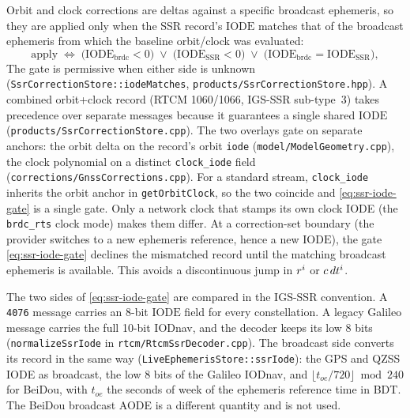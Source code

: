 \documentclass[main.tex]{subfiles}
\begin{document}
Orbit and clock corrections are deltas against a specific
broadcast ephemeris, so they are applied only when the SSR record's
$\mathrm{IODE}$ matches that of the broadcast ephemeris from which the
baseline orbit/clock was evaluated:
\begin{equation}
\text{apply}
\;\Longleftrightarrow\;
\big(\mathrm{IODE}_{\mathrm{brdc}} < 0\big)
\;\vee\;
\big(\mathrm{IODE}_{\mathrm{SSR}} < 0\big)
\;\vee\;
\big(\mathrm{IODE}_{\mathrm{brdc}} = \mathrm{IODE}_{\mathrm{SSR}}\big),
\label{eq:ssr-iode-gate}
\end{equation}
The gate is permissive when either side is unknown
(\texttt{SsrCorrectionStore::iodeMatches},
\texttt{products/SsrCorrectionStore.hpp}). A combined orbit+clock
record (RTCM 1060/1066, IGS-SSR sub-type~3) takes precedence over separate
messages because it guarantees a single shared $\mathrm{IODE}$
(\texttt{products/SsrCorrectionStore.cpp}). The two overlays gate on
separate anchors: the orbit delta on the record's orbit
\texttt{iode} (\texttt{model/ModelGeometry.cpp}), the clock polynomial on
a distinct \texttt{clock\_iode} field
(\texttt{corrections/GnssCorrections.cpp}). For a standard stream,
\texttt{clock\_iode} inherits the orbit anchor in \texttt{getOrbitClock},
so the two coincide and \eqref{eq:ssr-iode-gate} is a single gate. Only a
network clock that stamps its own clock IODE (the \texttt{brdc\_rts} clock
mode) makes them differ. At a correction-set boundary (the provider switches to a new
ephemeris reference, hence a new $\mathrm{IODE}$), the gate
\eqref{eq:ssr-iode-gate} declines the mismatched record until the matching
broadcast ephemeris is available. This avoids a discontinuous jump in
$r^{i}$ or $c\,dt^i$.

The two sides of \eqref{eq:ssr-iode-gate} are compared in the IGS-SSR
convention. A \texttt{4076} message carries an 8-bit $\mathrm{IODE}$ field
for every constellation. A legacy Galileo message carries the full 10-bit
IODnav, and the decoder keeps its low 8 bits
(\texttt{normalizeSsrIode} in \texttt{rtcm/RtcmSsrDecoder.cpp}). The
broadcast side converts its record in the same way
(\texttt{LiveEphemerisStore::ssrIode}): the GPS and QZSS IODE as broadcast,
the low 8 bits of the Galileo IODnav, and
$\lfloor t_{oe}/720\rfloor \bmod 240$ for BeiDou, with $t_{oe}$ the
seconds of week of the ephemeris reference time in BDT. The BeiDou
broadcast AODE is a different quantity and is not used.
\end{document}
